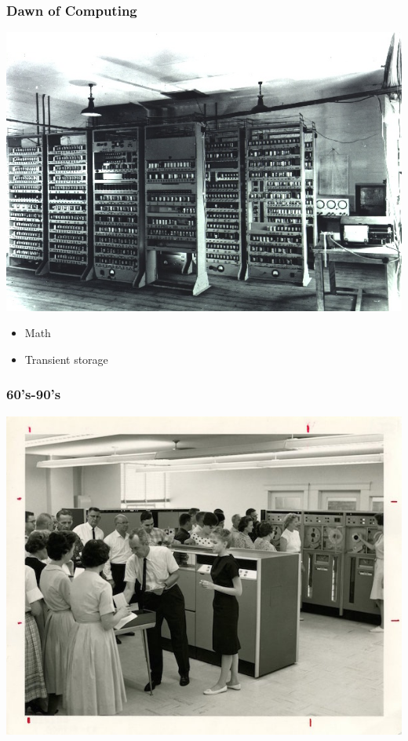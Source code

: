 \documentclass[11pt]{article}
\begin{document}
\subsubsection*{Dawn of Computing}
\label{sec:orgheadline5}

\includegraphics[width=.9\linewidth]{./EDSAC.jpg}

\begin{itemize}
\item Math
\item Transient storage
\end{itemize}

\subsubsection*{60's-90's}
\label{sec:orgheadline6}

\includegraphics[width=.9\linewidth]{./1960s-computer.jpg}
\end{document}
